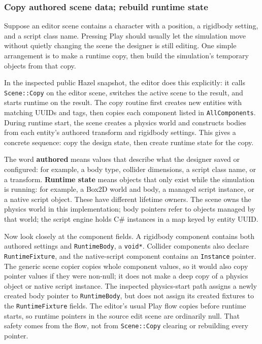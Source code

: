 \subsubsection{Copy authored scene data; rebuild runtime state}\label{06-engine-ii-ch032-copy-authored-scene-data-rebuild-runtime-state}

Suppose an editor scene contains a character with a position, a rigidbody setting, and a script class name. Pressing Play should usually let the simulation move without quietly changing the scene the designer is still editing. One simple arrangement is to make a runtime copy, then build the simulation's temporary objects from that copy.

In the inspected public Hazel snapshot, the editor does this explicitly: it calls \texttt{Scene::Copy} on the editor scene, switches the active scene to the result, and starts runtime on the result. The copy routine first creates new entities with matching UUIDs and tags, then copies each component listed in \texttt{AllComponents}. During runtime start, the scene creates a physics world and constructs bodies from each entity's authored transform and rigidbody settings. This gives a concrete sequence: copy the design state, then create runtime state for the copy.

The word \textbf{authored} means values that describe what the designer saved or configured: for example, a body type, collider dimensions, a script class name, or a transform. \textbf{Runtime state} means objects that only exist while the simulation is running: for example, a Box2D world and body, a managed script instance, or a native script object. These have different lifetime owners. The scene owns the physics world in this implementation; body pointers refer to objects managed by that world; the script engine holds C\# instances in a map keyed by entity UUID.

Now look closely at the component fields. A rigidbody component contains both authored settings and \texttt{RuntimeBody}, a \texttt{void*}. Collider components also declare \texttt{RuntimeFixture}, and the native-script component contains an \texttt{Instance} pointer. The generic scene copier copies whole component values, so it would also copy pointer values if they were non-null; it does not make a deep copy of a physics object or native script instance. The inspected physics-start path assigns a newly created body pointer to \texttt{RuntimeBody}, but does not assign its created fixtures to the \texttt{RuntimeFixture} fields. The editor's usual Play flow copies before runtime starts, so runtime pointers in the source edit scene are ordinarily null. That safety comes from the flow, not from \texttt{Scene::Copy} clearing or rebuilding every pointer.

